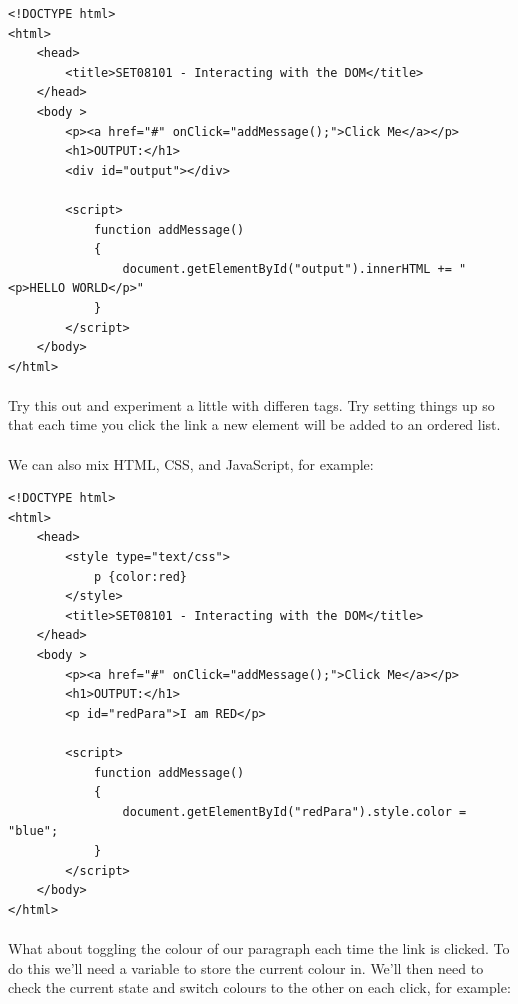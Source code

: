 \documentclass[10pt, a4paper, twosize]{article}
\begin{document}
\begin{lstlisting}
<!DOCTYPE html>
<html>
    <head> 
        <title>SET08101 - Interacting with the DOM</title>
    </head>
    <body >
        <p><a href="#" onClick="addMessage();">Click Me</a></p>
        <h1>OUTPUT:</h1>
        <div id="output"></div>

        <script>
            function addMessage() 
            { 
                document.getElementById("output").innerHTML += "<p>HELLO WORLD</p>"
            }      
        </script>
    </body>
</html>
\end{lstlisting}


\paragraph{} Try this out and experiment a little with differen tags. Try setting things up so that each time you click the link a new element will be added to an ordered list.

\paragraph{} We can also mix HTML, CSS, and JavaScript, for example:

\begin{lstlisting}
<!DOCTYPE html>
<html>
    <head>
        <style type="text/css">
            p {color:red}
        </style>
        <title>SET08101 - Interacting with the DOM</title>
    </head>
    <body >
        <p><a href="#" onClick="addMessage();">Click Me</a></p>
        <h1>OUTPUT:</h1>
        <p id="redPara">I am RED</p>

        <script>
            function addMessage() 
            { 
                document.getElementById("redPara").style.color = "blue";
            }      
        </script>
    </body>
</html>
\end{lstlisting}

\paragraph{} What about toggling the colour of our paragraph each time the link is clicked. To do this we'll need a variable to store the current colour in. We'll then need to check the current state and switch colours to the other on each click, for example:
\end{document}

